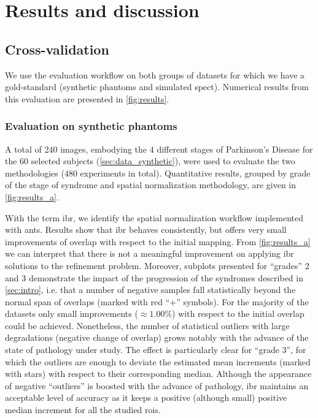 \documentclass{frontiers}
\begin{document}
\section{Results and discussion}
\label{sec:results}

\subsection{Cross-validation}
\label{sec:results_test}
We use the evaluation workflow on both groups of datasets
  for which we have a gold-standard (synthetic phantoms and simulated \gls*{spect}).
Numerical results from this evaluation are presented in \autoref{fig:results}.

\subsubsection{Evaluation on synthetic phantoms}
\label{sec:results_phantoms}
A total of 240 images, embodying the 4 different stages
  of Parkinson's Disease for the 60 selected subjects
  (\autoref{sec:data_synthetic}), were used to evaluate
  the two methodologies (480 experiments in total).
Quantitative results, grouped by grade of the stage of
  syndrome and spatial normalization methodology, 
  are given in \autoref{fig:results_a}.

With the term \gls*{ibr}, we identify the spatial normalization
  workflow implemented with \gls*{ants}.
Results show that \gls*{ibr} behaves consistently,
  but offers very small improvements of overlap with respect to the
  initial mapping.
From \autoref{fig:results_a} we can interpret that there is not 
  a meaningful improvement on applying \gls*{ibr} solutions to 
  the refinement problem.
Moreover, subplots presented for ``grades'' 2 and 3 demonstrate the
  impact of the progression of the syndromes described in 
  \autoref{sec:intro}, i.e. that a number of negative samples fall 
   statistically beyond the normal span of overlaps (marked with red ``+'' symbols).
For the majority of the datasets only small improvements ($\approx1.00\%$)
  with respect to the initial overlap could be achieved.
Nonetheless, the number of statistical outliers with large degradations
  (negative change of overlap) grows notably with the advance of the state of
  pathology under study.
The effect is particularly clear for ``grade 3'', for which the outliers are enough
  to deviate the estimated mean increments (marked with stars) with respect to their
  corresponding median.
Although the appearance of negative ``outliers'' is boosted with the advance
  of pathology, \gls*{ibr} maintains an acceptable level of accuracy as it keeps
  a positive (although small) positive median increment for all the studied \glspl*{roi}.
  
\end{document}
